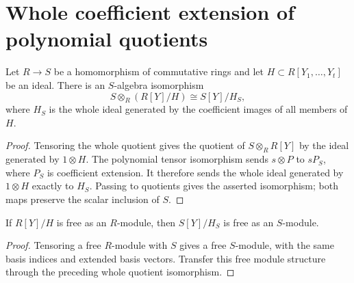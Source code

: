 \section{Whole coefficient extension of polynomial quotients}

\begin{lemma}
\label{hir:relative-normal-coefficient-polynomial-quotient-base-change}
\leanok
Let $R\to S$ be a homomorphism of commutative rings and let
$H\subset R[Y_1,\ldots,Y_t]$ be an ideal. There is an $S$-algebra
isomorphism
\[
 S\otimes_R(R[Y]/H)\cong S[Y]/H_S,
\]
where $H_S$ is the whole ideal generated by the coefficient images of all
members of $H$.
\end{lemma}
\begin{proof}
Tensoring the whole quotient gives the quotient of $S\otimes_R R[Y]$ by
the ideal generated by $1\otimes H$. The polynomial tensor isomorphism
sends $s\otimes P$ to $sP_S$, where $P_S$ is coefficient extension.
It therefore sends the whole ideal generated by $1\otimes H$ exactly to
$H_S$. Passing to quotients gives the asserted isomorphism; both maps
preserve the scalar inclusion of $S$.
\end{proof}

\begin{corollary}
\label{hir:relative-normal-coefficient-polynomial-free-base-change}
\leanok
{}
If $R[Y]/H$ is free as an $R$-module, then $S[Y]/H_S$ is free as an
$S$-module.
\end{corollary}
\begin{proof}
Tensoring a free $R$-module with $S$ gives a free $S$-module, with the same
basis indices and extended basis vectors. Transfer this free module structure
through the preceding whole quotient isomorphism.
\end{proof}


